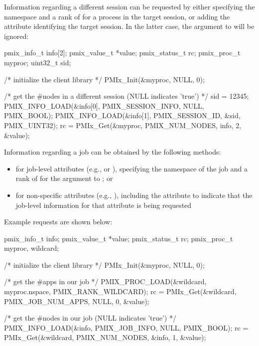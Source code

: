 Information regarding a different session can be requested by either specifying the namespace and a rank of  for a process in the target session, or adding the  attribute identifying the target session. In the latter case, the  argument to  will be ignored:

\cspecificstart
\begin{codepar}
pmix_info_t info[2];
pmix_value_t *value;
pmix_status_t rc;
pmix_proc_t myproc;
uint32_t sid;

/* initialize the client library */
PMIx_Init(&myproc, NULL, 0);

/* get the #nodes in a different session (NULL indicates 'true') */
sid = 12345;
PMIX_INFO_LOAD(&info[0], PMIX_SESSION_INFO, NULL, PMIX_BOOL);
PMIX_INFO_LOAD(&info[1], PMIX_SESSION_ID, &sid, PMIX_UINT32);
rc = PMIx_Get(&myproc, PMIX_NUM_NODES, info, 2, &value);
\end{codepar}
\cspecificend


Information regarding a job can be obtained by the following methods:

\begin{itemize}
\item for job-level attributes (e.g.,  or ), specifying the namespace of the job and a rank of  for the  argument to ; or
\item for non-specific attributes (e.g., ), including the  attribute to indicate that the job-level information for that attribute is being requested
\end{itemize}

Example requests are shown below:

\cspecificstart
\begin{codepar}
pmix_info_t info;
pmix_value_t *value;
pmix_status_t rc;
pmix_proc_t myproc, wildcard;

/* initialize the client library */
PMIx_Init(&myproc, NULL, 0);

/* get the #apps in our job */
PMIX_PROC_LOAD(&wildcard, myproc.nspace, PMIX_RANK_WILDCARD);
rc = PMIx_Get(&wildcard, PMIX_JOB_NUM_APPS, NULL, 0, &value);

/* get the #nodes in our job (NULL indicates 'true') */
PMIX_INFO_LOAD(&info, PMIX_JOB_INFO, NULL, PMIX_BOOL);
rc = PMIx_Get(&wildcard, PMIX_NUM_NODES, &info, 1, &value);
\end{codepar}
\cspecificend


